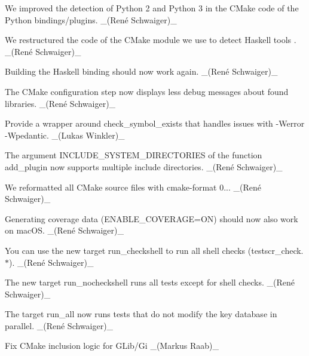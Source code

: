 \begin{DoxyItemize}
\item We improved the detection of Python 2 and Python 3 in the C\+Make code of the Python bindings/plugins. \+\_\+(René Schwaiger)\+\_\+
\item We restructured the code of the C\+Make module we use to detect Haskell tools . \+\_\+(René Schwaiger)\+\_\+
\item Building the Haskell binding should now work again. \+\_\+(René Schwaiger)\+\_\+
\item The C\+Make configuration step now displays less debug messages about found libraries. \+\_\+(René Schwaiger)\+\_\+
\item Provide a wrapper around {\ttfamily check\+\_\+symbol\+\_\+exists} that handles issues with {\ttfamily -\/Werror -\/Wpedantic}. \+\_\+(\+Lukas Winkler)\+\_\+
\item The argument {\ttfamily I\+N\+C\+L\+U\+D\+E\+\_\+\+S\+Y\+S\+T\+E\+M\+\_\+\+D\+I\+R\+E\+C\+T\+O\+R\+I\+ES} of the function {\ttfamily add\+\_\+plugin} now supports multiple include directories. \+\_\+(René Schwaiger)\+\_\+
\item We reformatted all C\+Make source files with cmake-\/format 0... \+\_\+(René Schwaiger)\+\_\+
\item Generating coverage data ({\ttfamily E\+N\+A\+B\+L\+E\+\_\+\+C\+O\+V\+E\+R\+A\+GE=ON}) should now also work on mac\+OS. \+\_\+(René Schwaiger)\+\_\+
\item You can use the new target {\ttfamily run\+\_\+checkshell} to run all shell checks ({\ttfamily testscr\+\_\+check.$\ast$}). \+\_\+(René Schwaiger)\+\_\+
\item The new target {\ttfamily run\+\_\+nocheckshell} runs all tests except for shell checks. \+\_\+(René Schwaiger)\+\_\+
\item The target {\ttfamily run\+\_\+all} now runs tests that do not modify the key database in parallel. \+\_\+(René Schwaiger)\+\_\+
\item Fix C\+Make inclusion logic for G\+Lib/\+Gi \+\_\+(\+Markus Raab)\+\_\+
\end{DoxyItemize}



